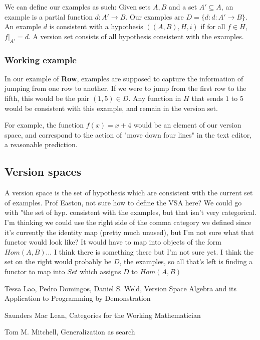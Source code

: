 \documentclass{article}
\theoremstyle{definition}
\begin{document}
We can define our examples as such: Given sets $A, B$ and a set $A'\subseteq A$, an example is a partial function $d: A' \rightarrow B$. Our examples are $D = \{d : d: A'\rightarrow B\}$. An example $d$ is consistent with a hypothesis $((A,B), H, i)$ if for all $f \in H$, $f|_{A'} = d$. A version set consists of all hypothesis consistent with the examples.

\subsubsection{Working example}
In our example of \textbf{Row}, examples are supposed to capture the information of jumping from one row to another. If we were to jump from the first row to the fifth, this would be the pair $(1,5)\in D$. Any function in $H$ that sends $1$ to $5$ would be consistent with this example, and remain in the version set. 

For example, the function $f(x) = x + 4$ would be an element of our version space, and correspond to the action of "move down four lines" in the text editor, a reasonable prediction. 

\subsection{Version spaces}
A version space is the set of hypothesis which are consistent with the current set of examples. Prof Easton, not sure how to define the VSA here? We could go with "the set of hyp. consistent with the examples, but that isn't very categorical. I'm thinking we could use the right side of the comma category we defined since it's currently the identity map (pretty much unused), but I'm not sure what that functor would look like? It would have to map into objects of the form $Hom(A,B)$... I think there is something there but I'm not sure yet. I think the set on the right would probably be $D$, the examples, so all that's left is finding a functor to map into $Set$ which assigns $D$ to $Hom(A,B)$


\begin{thebibliography}{9}
Tessa Lao, Pedro Domingos, Daniel S. Weld, Version Space Algebra and its Application to Programming by Demonstration

Saunders Mac Lean, Categories for the Working Mathematician

Tom M. Mitchell, Generalization as search
\end{thebibliography}
\end{document}
